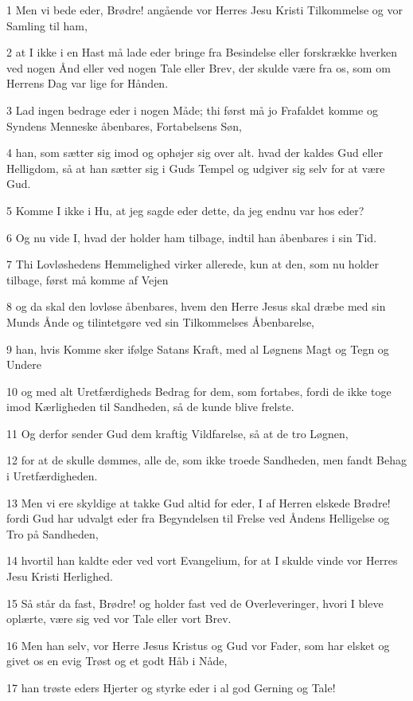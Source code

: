\par 1 Men vi bede eder, Brødre! angående vor Herres Jesu Kristi Tilkommelse og vor Samling til ham,
\par 2 at I ikke i en Hast må lade eder bringe fra Besindelse eller forskrække hverken ved nogen Ånd eller ved nogen Tale eller Brev, der skulde være fra os, som om Herrens Dag var lige for Hånden.
\par 3 Lad ingen bedrage eder i nogen Måde; thi først må jo Frafaldet komme og Syndens Menneske åbenbares, Fortabelsens Søn,
\par 4 han, som sætter sig imod og ophøjer sig over alt. hvad der kaldes Gud eller Helligdom, så at han sætter sig i Guds Tempel og udgiver sig selv for at være Gud.
\par 5 Komme I ikke i Hu, at jeg sagde eder dette, da jeg endnu var hos eder?
\par 6 Og nu vide I, hvad der holder ham tilbage, indtil han åbenbares i sin Tid.
\par 7 Thi Lovløshedens Hemmelighed virker allerede, kun at den, som nu holder tilbage, først må komme af Vejen
\par 8 og da skal den lovløse åbenbares, hvem den Herre Jesus skal dræbe med sin Munds Ånde og tilintetgøre ved sin Tilkommelses Åbenbarelse,
\par 9 han, hvis Komme sker ifølge Satans Kraft, med al Løgnens Magt og Tegn og Undere
\par 10 og med alt Uretfærdigheds Bedrag for dem, som fortabes, fordi de ikke toge imod Kærligheden til Sandheden, så de kunde blive frelste.
\par 11 Og derfor sender Gud dem kraftig Vildfarelse, så at de tro Løgnen,
\par 12 for at de skulle dømmes, alle de, som ikke troede Sandheden, men fandt Behag i Uretfærdigheden.
\par 13 Men vi ere skyldige at takke Gud altid for eder, I af Herren elskede Brødre! fordi Gud har udvalgt eder fra Begyndelsen til Frelse ved Åndens Helligelse og Tro på Sandheden,
\par 14 hvortil han kaldte eder ved vort Evangelium, for at I skulde vinde vor Herres Jesu Kristi Herlighed.
\par 15 Så står da fast, Brødre! og holder fast ved de Overleveringer, hvori I bleve oplærte, være sig ved vor Tale eller vort Brev.
\par 16 Men han selv, vor Herre Jesus Kristus og Gud vor Fader, som har elsket og givet os en evig Trøst og et godt Håb i Nåde,
\par 17 han trøste eders Hjerter og styrke eder i al god Gerning og Tale!

